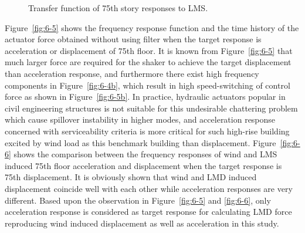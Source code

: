 \begin{figure}[!ht]
\centering
{}
\caption{Transfer function of 75th story responses to LMS.}
\label{fig:6-4}
\end{figure}

Figure~\ref{fig:6-5} shows the frequency response function and the time history of the actuator force obtained without using filter when the target response is acceleration or displacement of 75th floor. It is known from Figure~\ref{fig:6-5} that much larger force are required for the shaker to achieve the target displacement than acceleration response, and furthermore there exist high frequency components in Figure~\ref{fig:6-4b}, which result in high speed-switching of control force as shown in Figure~\ref{fig:6-5b}. In practice, hydraulic actuators popular in civil engineering structures is not suitable for this undesirable chattering problem which cause spillover instability in higher modes, and acceleration response concerned with serviceability criteria is more critical for such high-rise building excited by wind load as this benchmark building than displacement. 
Figure~\ref{fig:6-6} shows the comparison between the frequency responses of wind and LMS induced 75th floor acceleration and displacement when the target response is 75th displacement. It is obviously shown that wind and LMD induced displacement coincide well with each other while acceleration responses are very different. Based upon the observation in Figure~\ref{fig:6-5} and  \ref{fig:6-6}, only acceleration response is considered as target response for calculating LMD force reproducing wind induced displacement as well as acceleration in this study.

